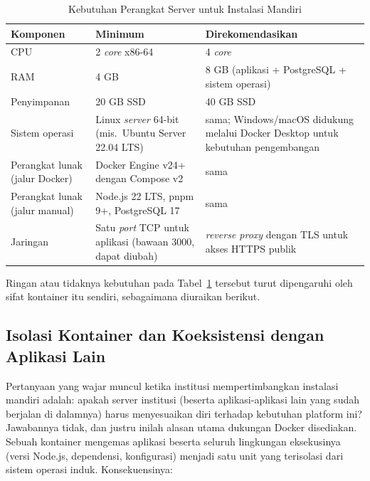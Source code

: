 \begin{table}[htbp]
  \centering
  \caption{Kebutuhan Perangkat Server untuk Instalasi Mandiri}
  \label{tab:kebutuhan-onprem}
  \begin{tabularx}{\textwidth}{@{}l X X@{}}
    \toprule
    \textbf{Komponen} & \textbf{Minimum} & \textbf{Direkomendasikan} \\
    \midrule
    CPU & 2 \textit{core} x86-64 & 4 \textit{core} \\
    RAM & 4 GB & 8 GB (aplikasi + PostgreSQL + sistem operasi) \\
    Penyimpanan & 20 GB SSD & 40 GB SSD \\
    Sistem operasi & Linux \textit{server} 64-bit (mis.\ Ubuntu Server 22.04 LTS) & sama; Windows/macOS didukung melalui Docker Desktop untuk kebutuhan pengembangan \\
    Perangkat lunak (jalur Docker) & Docker Engine v24+ dengan Compose v2 & sama \\
    Perangkat lunak (jalur manual) & Node.js 22 LTS, pnpm 9+, PostgreSQL 17 & sama \\
    Jaringan & Satu \textit{port} TCP untuk aplikasi (bawaan 3000, dapat diubah) & \textit{reverse proxy} dengan TLS untuk akses HTTPS publik \\
    \bottomrule
  \end{tabularx}
\end{table}

Ringan atau tidaknya kebutuhan pada Tabel~\ref{tab:kebutuhan-onprem} tersebut turut dipengaruhi oleh sifat kontainer itu sendiri, sebagaimana diuraikan berikut.

\subsection{Isolasi Kontainer dan Koeksistensi dengan Aplikasi Lain}
\label{subsec:isolasi-kontainer}

Pertanyaan yang wajar muncul ketika institusi mempertimbangkan instalasi mandiri adalah: apakah server institusi (beserta aplikasi-aplikasi lain yang sudah berjalan di dalamnya) harus menyesuaikan diri terhadap kebutuhan platform ini? Jawabannya tidak, dan justru inilah alasan utama dukungan Docker disediakan. Sebuah kontainer mengemas aplikasi beserta seluruh lingkungan eksekusinya (versi Node.js, dependensi, konfigurasi) menjadi satu unit yang terisolasi dari sistem operasi induk. Konsekuensinya:

